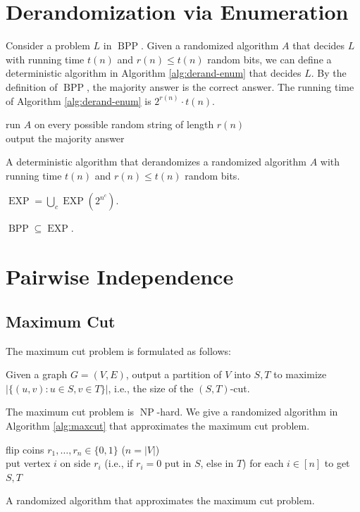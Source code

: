 \documentclass[letterpaper, reqno,11pt]{article}
\DeclareMathOperator{\BPP}{BPP}
\DeclareMathOperator{\EXP}{EXP}
\DeclareMathOperator{\NP}{NP}
\begin{document}
\section{Derandomization via Enumeration}

Consider a problem $L$ in $\BPP$. Given a randomized algorithm $A$ that decides $L$ with running time $t(n)$ and $r(n) \leq t(n)$ random bits, we can define a deterministic algorithm in Algorithm \ref{alg:derand-enum} that decides $L$. By the definition of $\BPP$, the majority answer is the correct answer. The running time of Algorithm \ref{alg:derand-enum} is $2^{r(n)} \cdot t(n)$.

\begin{algorithm}
  run $A$ on every possible random string of length $r(n)$ \\
  output the majority answer
  \caption{A deterministic algorithm that derandomizes a randomized algorithm $A$ with running time $t(n)$ and $r(n) \leq t(n)$ random bits.}
  \label{alg:derand-enum}
\end{algorithm}

\begin{definition}
  $\EXP = \bigcup_c \EXP(2^{n^c})$.
\end{definition}

\begin{corollary}
  $\BPP \subseteq \EXP$.
\end{corollary}

\section{Pairwise Independence}

\subsection{Maximum Cut}

The maximum cut problem is formulated as follows:
\begin{problem}
  Given a graph $G = (V, E)$, output a partition of $V$ into $S, T$ to maximize $|\{ (u, v) : u \in S, v \in T \}|$, i.e., the size of the $(S, T)$-cut.
\end{problem}

The maximum cut problem is $\NP$-hard. We give a randomized algorithm in Algorithm \ref{alg:maxcut} that approximates the maximum cut problem.

\begin{algorithm}
  flip coins $r_1, \ldots, r_n \in \{ 0, 1 \}$ ($n = |V|$) \\
  put vertex $i$ on side $r_i$ (i.e., if $r_i = 0$ put in $S$, else in $T$) for each $i \in [n]$ to get $S, T$
  \caption{A randomized algorithm that approximates the maximum cut problem.}
  \label{alg:maxcut}
\end{algorithm}
\end{document}
